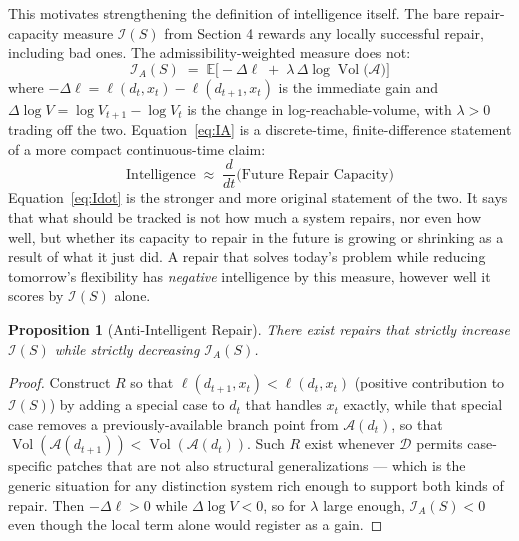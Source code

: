 \documentclass[11pt]{article}
\theoremstyle{plain}
\newtheorem{proposition}[theorem]{Proposition}
\theoremstyle{definition}
\theoremstyle{remark}
\begin{document}
This motivates strengthening the definition of intelligence itself. The bare repair-capacity measure $\mathcal{I}(S)$ from Section 4 rewards any locally successful repair, including bad ones. The admissibility-weighted measure does not:
\begin{equation}
\boxed{\;\mathcal{I}_A(S) \;=\; \mathbb{E}\Big[-\Delta\ell \;+\; \lambda\, \Delta \log \operatorname{Vol}\big(\mathcal{A}\big)\Big]\;}
\label{eq:IA}
\end{equation}
where $-\Delta\ell = \ell(d_t,x_t) - \ell(d_{t+1},x_t)$ is the immediate gain and $\Delta \log V = \log V_{t+1} - \log V_t$ is the change in log-reachable-volume, with $\lambda > 0$ trading off the two. Equation~\eqref{eq:IA} is a discrete-time, finite-difference statement of a more compact continuous-time claim:
\begin{equation}
\boxed{\;\text{Intelligence} \;\approx\; \frac{d}{dt}\big(\text{Future Repair Capacity}\big)\;}
\label{eq:Idot}
\end{equation}
Equation~\eqref{eq:Idot} is the stronger and more original statement of the two. It says that what should be tracked is not how much a system repairs, nor even how well, but whether its capacity to repair in the future is growing or shrinking as a result of what it just did. A repair that solves today's problem while reducing tomorrow's flexibility has \emph{negative} intelligence by this measure, however well it scores by $\mathcal{I}(S)$ alone.

\begin{proposition}[Anti-Intelligent Repair]
There exist repairs that strictly increase $\mathcal{I}(S)$ while strictly decreasing $\mathcal{I}_A(S)$.
\end{proposition}
\begin{proof}
Construct $R$ so that $\ell(d_{t+1},x_t) < \ell(d_t,x_t)$ (positive contribution to $\mathcal{I}(S)$) by adding a special case to $d_t$ that handles $x_t$ exactly, while that special case removes a previously-available branch point from $\mathcal{A}(d_t)$, so that $\operatorname{Vol}(\mathcal{A}(d_{t+1})) < \operatorname{Vol}(\mathcal{A}(d_t))$. Such $R$ exist whenever $\mathcal{D}$ permits case-specific patches that are not also structural generalizations --- which is the generic situation for any distinction system rich enough to support both kinds of repair. Then $-\Delta\ell > 0$ while $\Delta \log V < 0$, so for $\lambda$ large enough, $\mathcal{I}_A(S) < 0$ even though the local term alone would register as a gain.
\end{proof}
\end{document}
